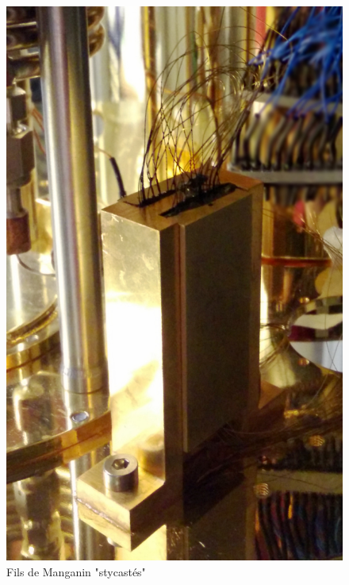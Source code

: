\documentclass[8pt,a9paper]{beamer} \usepackage[utf8]{inputenc} \usepackage[francais]{babel} \usepackage[T1]{fontenc}
\begin{document}
\begin{frame}
\begin{columns}
\begin{column}{0.3\textwidth}
\begin{figure}
\begin{center}
        \includegraphics[width=\textwidth]{Images/Thermalisation/DC}
        \caption{Fils de Manganin "stycastés"}
    \end{center}
\end{figure}
\end{column}
\end{columns}
\end{frame}
\end{document}
